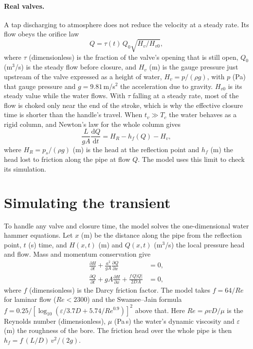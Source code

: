\documentclass[a4paper,justified,nobib]{tufte-handout}
\newcommand{\dd}{\mathrm{d}}
\newcommand{\sidecite}[2][]{\sidenote{\citet{#2}\ifx&#1&\else, #1\fi.}}
\begin{document}
\paragraph{Real valves.} A tap discharging to atmosphere does not reduce the
velocity at a steady rate. Its flow obeys the orifice law
\begin{equation}
  Q = \tau(t)\,Q_0\sqrt{H_v/H_{v0}},
  \label{eq:orifice}
\end{equation}
where $\tau$ (dimensionless) is the fraction of the valve's opening that is
still open, $Q_0$ (m$^3$/s) is the steady flow before closure, and $H_v$ (m) is
the gauge pressure just upstream of the valve expressed as a height of water,
$H_v=p/(\rho g)$, with $p$ (Pa) that gauge pressure and $g=9.81$\,m/s$^2$ the
acceleration due to gravity. $H_{v0}$ is its steady value while the water
flows. With $\tau$ falling at a steady rate, most of the flow is choked only
near the end of the stroke, which is why the effective closure time is shorter
than the handle's travel. When $t_v\gg T_c$ the water behaves as a rigid column,
and Newton's law for the whole column gives
\begin{equation}
  \frac{L}{gA}\frac{\dd Q}{\dd t} = H_R - h_f(Q) - H_v,
  \label{eq:rigid}
\end{equation}
where $H_R=p_s/(\rho g)$ (m) is the head at the reflection point and $h_f$ (m)
the head lost to friction along the pipe at flow $Q$. The model uses this limit
to check its simulation.

\section{Simulating the transient}

To handle any valve and closure time, the model solves the one-dimensional
water hammer equations.\sidecite[ch.~3]{wylie1993} Let $x$ (m) be the distance
along the pipe from the reflection point, $t$ (s) time, and $H(x,t)$ (m) and
$Q(x,t)$ (m$^3$/s) the local pressure head and flow. Mass and momentum
conservation give
\begin{align}
  \frac{\partial H}{\partial t} + \frac{a^2}{gA}\frac{\partial Q}{\partial x} &= 0, \\
  \frac{\partial Q}{\partial t} + gA\frac{\partial H}{\partial x} + \frac{f\,Q|Q|}{2DA} &= 0,
\end{align}
where $f$ (dimensionless) is the Darcy friction factor. The model takes
$f=64/Re$ for laminar flow ($Re<2300$) and the Swamee--Jain formula
$f=0.25\big/\left[\log_{10}\!\left(\varepsilon/3.7D+5.74/Re^{0.9}\right)\right]^2$
above that. Here $Re=\rho vD/\mu$ is the Reynolds number (dimensionless), $\mu$
(Pa\,s) the water's dynamic viscosity and $\varepsilon$ (m) the roughness of the
bore. The friction head over the whole pipe is then
$h_f=f\,(L/D)\,v^2/(2g)$.
\end{document}
